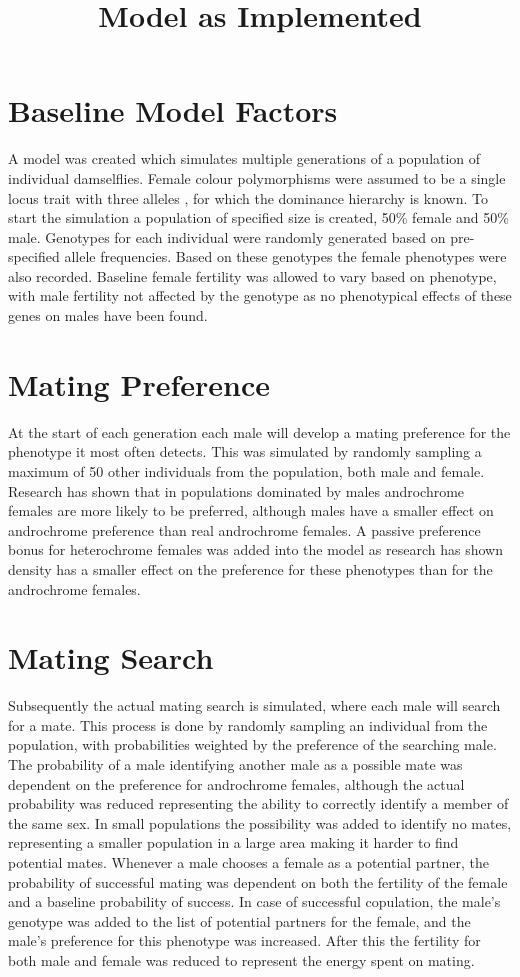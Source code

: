 \documentclass{article}
\title{Model as Implemented}
\date{\vspace{-5ex}}
\begin{document}
\maketitle

\section{Baseline Model Factors}
A model was created which simulates multiple generations of a population of individual damselflies. Female colour polymorphisms were assumed to be a single locus trait with three alleles \cite{}, for which the dominance hierarchy is known. To start the simulation a population of specified size is created, 50\% female and 50\% male. Genotypes for each individual were randomly generated based on pre-specified allele frequencies. Based on these genotypes the female phenotypes were also recorded. Baseline female fertility was allowed to vary based on phenotype, with male fertility not affected by the genotype as no phenotypical effects of these genes on males have been found.

\section{Mating Preference}

At the start of each generation each male will develop a mating preference for the phenotype it most often detects. This was simulated by randomly sampling a maximum of 50 other individuals from the population, both male and female. Research has shown that in populations dominated by males androchrome females are more likely to be preferred, although males have a smaller effect on androchrome preference than real androchrome females. A passive preference bonus for heterochrome females was added into the model as research has shown density has a smaller effect on the preference for these phenotypes than for the androchrome females.

\section{Mating Search}
Subsequently the actual mating search is simulated, where each male will search for a mate. This process is done by randomly sampling an individual from the population, with probabilities weighted by the preference of the searching male. The probability of a male identifying another male as a possible mate was dependent on the preference for androchrome females, although the actual probability was reduced representing the ability to correctly identify a member of the same sex. In small populations the possibility was added to identify no mates, representing a smaller population in a large area making it harder to find potential mates. Whenever a male chooses a female as a potential partner, the probability of successful mating was dependent on both the fertility of the female and a baseline probability of success. In case of successful copulation, the male's genotype was added to the list of potential partners for the female, and the male's preference for this phenotype was increased. After this the fertility for both male and female was reduced to represent the energy spent on mating.
\end{document}
